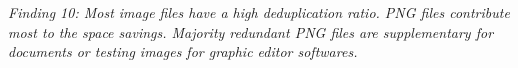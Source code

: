 \textit{Finding 10: Most image files have a high deduplication ratio. PNG files contribute most to the space savings. Majority redundant PNG files are supplementary for documents or testing images for graphic editor softwares.}
%
%
%
%
